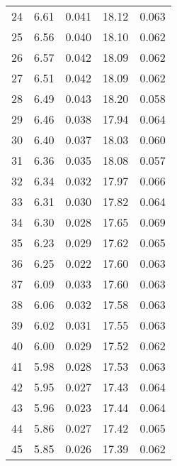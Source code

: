 \begin{table}
\begin{tabular}{c|ll|ll}
24 & 6.61 & 0.041 & 18.12 & 0.063 \\
25 & 6.56 & 0.040 & 18.10 & 0.062 \\
26 & 6.57 & 0.042 & 18.09 & 0.062 \\
27 & 6.51 & 0.042 & 18.09 & 0.062 \\
28 & 6.49 & 0.043 & 18.20 & 0.058 \\
29 & 6.46 & 0.038 & 17.94 & 0.064 \\
30 & 6.40 & 0.037 & 18.03 & 0.060 \\
31 & 6.36 & 0.035 & 18.08 & 0.057 \\
32 & 6.34 & 0.032 & 17.97 & 0.066 \\
33 & 6.31 & 0.030 & 17.82 & 0.064 \\
34 & 6.30 & 0.028 & 17.65 & 0.069 \\
35 & 6.23 & 0.029 & 17.62 & 0.065 \\
36 & 6.25 & 0.022 & 17.60 & 0.063 \\
37 & 6.09 & 0.033 & 17.60 & 0.063 \\
38 & 6.06 & 0.032 & 17.58 & 0.063 \\
39 & 6.02 & 0.031 & 17.55 & 0.063 \\
40 & 6.00 & 0.029 & 17.52 & 0.062 \\
41 & 5.98 & 0.028 & 17.53 & 0.063 \\
42 & 5.95 & 0.027 & 17.43 & 0.064 \\
43 & 5.96 & 0.023 & 17.44 & 0.064 \\
44 & 5.86 & 0.027 & 17.42 & 0.065 \\
45 & 5.85 & 0.026 & 17.39 & 0.062 \\
               \hline
        \end{tabular}
    \end{table}
    \clearpage

